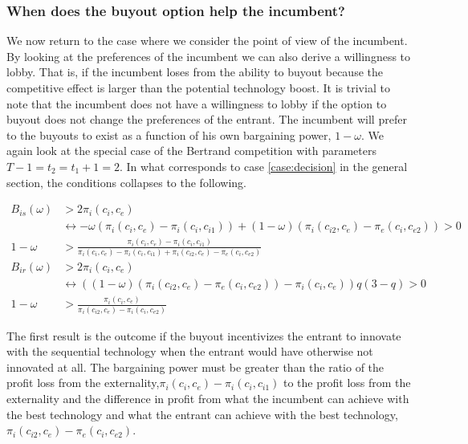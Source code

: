 \documentclass[12pt]{report}
\numberwithin{equation}{section}
\begin{document}
\subsubsection{When does the buyout option help the incumbent?}

We now return to the case where we consider the point of view of the incumbent. By looking at the preferences of the incumbent we can also derive a willingness to lobby. That is, if the incumbent loses from the ability to buyout because the competitive effect is larger than the potential technology boost. It is trivial to note that the incumbent does not have a willingness to lobby if the option to buyout does not change the preferences of the entrant. The incumbent will prefer to the buyouts to exist as a function of his own bargaining power, $1-\omega$. We again look at the special case of the Bertrand competition with parameters $T-1=t_2=t_1+1=2$. In what corresponds to case \ref{case:decision} in the general section, the conditions collapses to the following. 

\begin{align*}
B_{is}(\omega)&>2 \pi_i(c_i,c_e) \\
& \leftrightarrow -\omega(\pi_i(c_i,c_{e})- \pi_i(c_i,c_{i1})) 
+(1-\omega)(\pi_i(c_{i2},c_e)-\pi_e(c_{i},c_{e2})) >0 \\
1-\omega &> \frac{\pi_i(c_i,c_{e})- \pi_i(c_i,c_{i1})}{\pi_i(c_i,c_{e})- \pi_i(c_i,c_{i1})+\pi_i(c_{i2},c_e)-\pi_e(c_{i},c_{e2})}
\\
B_{ir}(\omega)&>2 \pi_i(c_i,c_e) \\
& \leftrightarrow ((1-\omega)(\pi_{i}(c_{i2},c_{e})-\pi_{e}(c_{i},c_{e2}))-\pi_i(c_i,c_e)) q(3-q)>0 \\
1-\omega&>\frac{\pi_i(c_i,c_e)}{\pi_i(c_{i2},c_e)-\pi_i(c_{i},c_{e2})}
\end{align*}

The first result is the outcome if the buyout incentivizes the entrant to innovate with the sequential technology when the entrant would have otherwise not innovated at all. The bargaining power must be greater than the ratio of the profit loss from the externality,$\pi_i(c_i,c_{e})- \pi_i(c_i,c_{i1})$ to the profit loss from the externality and the difference in profit from what the incumbent can achieve with the best technology and what the entrant can achieve with the best technology,$\pi_i(c_{i2},c_e)-\pi_e(c_{i},c_{e2})$. 
\end{document}
